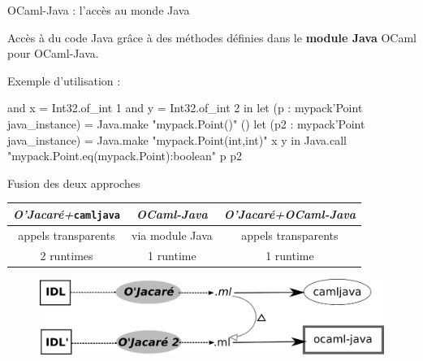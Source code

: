 \documentclass[xcolor={table,dvipsnames}]{beamer}
\newcommand{\camljava}{{\tt{camljava}}}
\begin{document}
\begin{frame}[fragile]{OCaml-Java : l'accès au monde Java}

  Accès à du code Java grâce à des méthodes définies dans le
  \textbf{module Java} OCaml pour OCaml-Java.

\bigskip

Exemple d'utilisation :

\begin{OCamlEx}
and x = Int32.of_int 1
and y = Int32.of_int 2 in
let (p : mypack'Point java_instance) = 
   Java.make "mypack.Point()" ()
let (p2 : mypack'Point java_instance) = 
   Java.make "mypack.Point(int,int)" x y 
in
   Java.call "mypack.Point.eq(mypack.Point):boolean" p p2
\end{OCamlEx}

\end{frame}


\begin{frame}{Fusion des deux approches}

\begin{tabular}{|c|c@{\,\vrule width 6pt\,}c|}
  \hline
   \cellcolor[gray]{0.6}\emph{O'Jacaré+}\camljava & \cellcolor[gray]{0.6}\emph{OCaml-Java}& \cellcolor[gray]{0.6} \emph{O'Jacaré+OCaml-Java}\\
  \hline\hline
 \cellcolor[gray]{0.8} appels transparents & via module Java & \cellcolor[gray]{0.8}appels transparents\\
\hline
  2 runtimes &\cellcolor[gray]{0.8} 1 runtime&\cellcolor[gray]{0.8} 1 runtime \\
\hline
\end{tabular}

\bigskip 

\begin{figure}[h]
  \centering
  \includegraphics[scale=1]{schema1.png}
\end{figure}

\end{frame}
\end{document}
